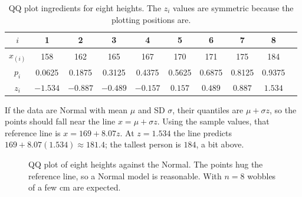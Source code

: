 \begin{table}[H]
\centering
\begin{tabular}{cccccccccc}
\toprule
$i$ & 1 & 2 & 3 & 4 & 5 & 6 & 7 & 8 \\
\midrule
$x_{(i)}$ & 158 & 162 & 165 & 167 & 170 & 171 & 175 & 184 \\
$p_i$ & 0.0625 & 0.1875 & 0.3125 & 0.4375 & 0.5625 & 0.6875 & 0.8125 & 0.9375 \\
$z_i$ & $-1.534$ & $-0.887$ & $-0.489$ & $-0.157$ & $0.157$ & $0.489$ & $0.887$ & $1.534$ \\
\bottomrule
\end{tabular}
\caption{QQ plot ingredients for eight heights. The $z_i$ values are symmetric
because the plotting positions are.}
\label{tab:quantiles-qq}
\end{table}

If the data are Normal with mean $\mu$ and SD $\sigma$, their quantiles are
$\mu + \sigma z$, so the points should fall near the line $x = \mu + \sigma z$. Using the
sample values, that reference line is $x = 169 + 8.07z$. At $z = 1.534$ the line predicts
$169 + 8.07(1.534) \approx 181.4$; the tallest person is $184$, a bit above.

\begin{figure}[H]
\centering
{}
\caption{QQ plot of eight heights against the Normal. The points hug the reference line,
so a Normal model is reasonable. With $n = 8$ wobbles of a few cm are expected.}
\label{fig:quantiles-qq-hand}
\end{figure}


